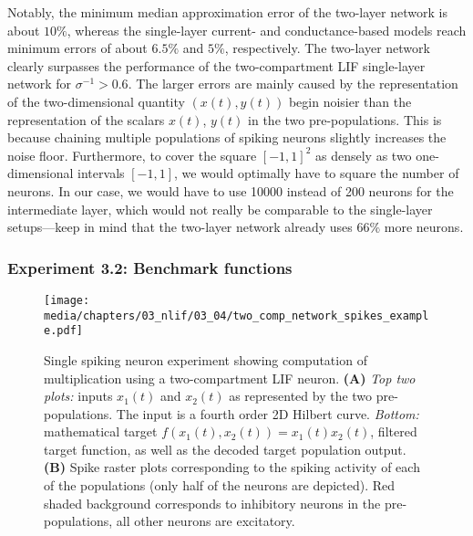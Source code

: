 Notably, the minimum median approximation error of the two-layer network is about $10\%$, whereas the single-layer current- and conductance-based models reach minimum errors of about $6.5\%$ and $5\%$, respectively. The two-layer network clearly surpasses the performance of the two-compartment LIF single-layer network for $\sigma^{-1} > 0.6$.
The larger errors are mainly caused by the representation of the two-dimensional quantity $(x(t), y(t))$ begin noisier than the representation of the scalars $x(t)$, $y(t)$ in the two pre-populations. This is because chaining multiple populations of spiking neurons slightly increases the noise floor. Furthermore, to cover the square $[-1, 1]^2$ as densely as two one-dimensional intervals $[-1, 1]$, we would optimally have to square the number of neurons. In our case, we would have to use \num{10000} instead of \num{200} neurons for the intermediate layer, which would not really be comparable to the single-layer setups---keep in mind that the two-layer network already uses $66\%$ more neurons.



\subsubsection*{Experiment 3.2: Benchmark functions}

\begin{figure}
	\texttt{[image: media/chapters/03\_nlif/03\_04/two\_comp\_network\_spikes\_example.pdf]}
	\caption[Single spiking neuron experiment showing computation of multiplication using a two-compartment LIF neuron.]{Single spiking neuron experiment showing computation of multiplication using a two-compartment LIF neuron.
	\textbf{(A)} \emph{Top two plots:} inputs $x_1(t)$ and $x_2(t)$ as represented by the two pre-populations. The input is a fourth order 2D Hilbert curve. \emph{Bottom:} mathematical target $f(x_1(t), x_2(t)) = x_1(t) x_2(t)$, filtered target function, as well as the decoded target population output.
	\textbf{(B)} Spike raster plots corresponding to the spiking activity of each of the populations (only half of the neurons are depicted). Red shaded background corresponds to inhibitory neurons in the pre-populations, all other neurons are excitatory.}
	\label{fig:spiking_example}
\end{figure}

